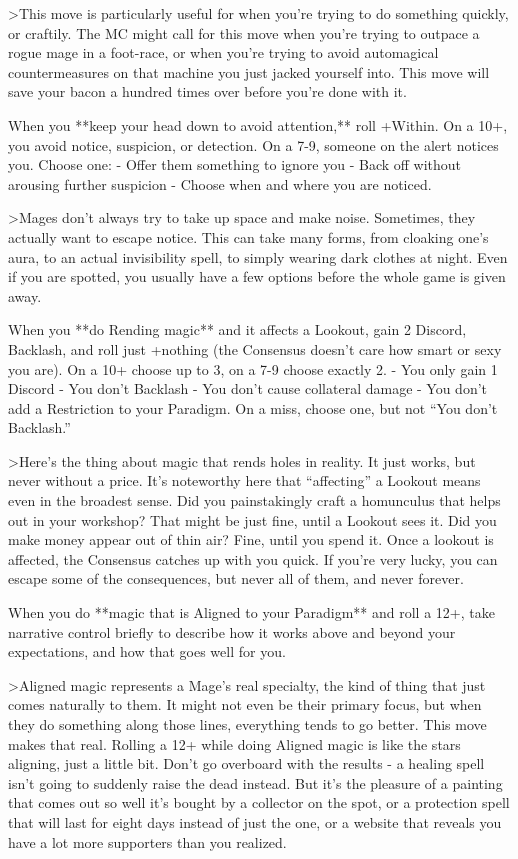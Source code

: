 \documentclass[
  oneside,
  statementpaper,
  9pt]{memoir}
\begin{document}
\begin{Player}
>This move is particularly useful for when you're trying to do something quickly, or craftily. The MC might call for this move when you're trying to outpace a rogue mage in a foot-race, or when you're trying to avoid automagical countermeasures on that machine you just jacked yourself into. This move will save your bacon a hundred times over before you're done with it.

When you **keep your head down to avoid attention,** roll +Within. On a 10+, you avoid notice, suspicion, or detection. On a 7-9, someone on the alert notices you. Choose one:
- Offer them something to ignore you
- Back off without arousing further suspicion
- Choose when and where you are noticed.

>Mages don’t always try to take up space and make noise. Sometimes, they actually want to escape notice. This can take many forms, from cloaking one’s aura, to an actual invisibility spell, to simply wearing dark clothes at night. Even if you are spotted, you usually have a few options before the whole game is given away.

When you **do Rending magic** and it affects a Lookout, gain 2 Discord, Backlash, and roll just +nothing (the Consensus doesn’t care how smart or sexy you are). On a 10+ choose up to 3, on a 7-9 choose exactly 2. 
- You only gain 1 Discord
- You don’t Backlash
- You don’t cause collateral damage
- You don’t add a Restriction to your Paradigm. 
On a miss, choose one, but not “You don’t Backlash.”

>Here’s the thing about magic that rends holes in reality. It just works, but never without a price. It’s noteworthy here that “affecting” a Lookout means even in the broadest sense. Did you painstakingly craft a homunculus that helps out in your workshop? That might be just fine, until a Lookout sees it. Did you make money appear out of thin air? Fine, until you spend it. Once a lookout is affected, the Consensus catches up with you quick. If you’re very lucky, you can escape some of the consequences, but never all of them, and never forever.

When you do **magic that is Aligned to your Paradigm** and roll a 12+, take narrative control briefly to describe how it works above and beyond your expectations, and how that goes well for you.

>Aligned magic represents a Mage’s real specialty, the kind of thing that just comes naturally to them. It might not even be their primary focus, but when they do something along those lines, everything tends to go better. This move makes that real. Rolling a 12+ while doing Aligned magic is like the stars aligning, just a little bit. Don’t go overboard with the results - a healing spell isn’t going to suddenly raise the dead instead. But it’s the pleasure of a painting that comes out so well it’s bought by a collector on the spot, or a protection spell that will last for eight days instead of just the one, or a website that reveals you have a lot more supporters than you realized.


\end{Player}
\end{document}
